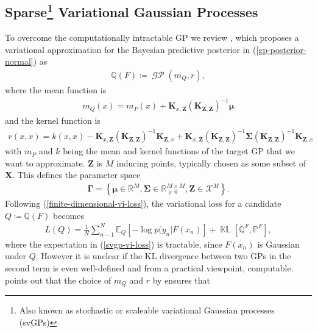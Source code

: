 \documentclass{article}
\newcommand{\KLD}{\operatorname{\mathbb{KL}}}
\newcommand{\GP}{\operatorname{\mathcal{GP}}}
\numberwithin{equation}{section}
\begin{document}
\subsection[Sparse Variational Gaussian Processes]{Sparse\footnote{Also known as stochastic or scaleable variational Gaussian processes (svGPs)} Variational Gaussian Processes}\label{section:svgp}
To overcome the computationally intractable GP we review \cite{titsias2009variational}, which proposes a variational approximation for the Bayesian predictive posterior in (\ref{gp-posterior-normal}) as
\begin{align}
    \mathbb{Q}(F) \coloneqq \GP(m_Q, r),
\end{align}
where the mean function is
\begin{align}
    \label{svgp-mean}
    m_Q(x) = m_P(x) + \mathbf{K}_{x, \mathbf{Z}}\left(\mathbf{K}_{\mathbf{Z}, \mathbf{Z}}\right)^{-1} \boldsymbol{\mu}
\end{align}
and the kernel function is
\begin{align}
r(x, x) = k(x, x) - \mathbf{K}_{x, \mathbf{Z}}\left(\mathbf{K}_{\mathbf{Z}, \mathbf{Z}}\right)^{-1} \mathbf{K}_{\mathbf{Z}, x} + \mathbf{K}_{x, \mathbf{Z}}\left(\mathbf{K}_{\mathbf{Z}, \mathbf{Z}}\right)^{-1}\mathbf{\Sigma}\left(\mathbf{K}_{\mathbf{Z}, \mathbf{Z}}\right)^{-1} \mathbf{K}_{\mathbf{Z}, x}
\label{svgp-covariance}
\end{align}
with $m_P$ and $k$ being the mean and kernel functions of the target GP that we want to approximate. 
$\mathbf{Z}$ is $M$ inducing points, typically chosen as some subset of $\mathbf{X}$.
This defines the parameter space
\begin{align}
    \mathbf{\Gamma} = \left\{\boldsymbol{\mu} \in \mathbb{R}^{M}, \mathbf{\Sigma} \in \mathbb{R}^{M\times M}_{\succcurlyeq 0}, \mathbf{Z} \in \mathcal{X}^M \right\}.
    \label{svgp-parameter-space}
\end{align}
Following (\ref{finite-dimensional-vi-loss}), the variational loss for a candidate $Q \coloneqq \mathbb{Q}(F)$ becomes
\begin{align}
L(Q) = \frac{1}{N}\sum_{n-1}^N \mathbb{E}_Q \left[-\log p(y_n \vert F(x_n)\right] + \KLD\left[\mathbb{Q}^F, \mathbb{P}^F\right],
\label{svgp-vi-loss}
\end{align}
where the expectation in (\ref{svgp-vi-loss}) is tractable, since $F(x_n)$ is Gaussian under $Q$.
However it is unclear if the KL divergence between two GPs in the second term is even well-defined and from a practical viewpoint, computable.
\cite{matthews2016sparse} points out that the choice of $m_Q$ and $r$ by \cite{titsias2009variational} ensures that
\end{document}
